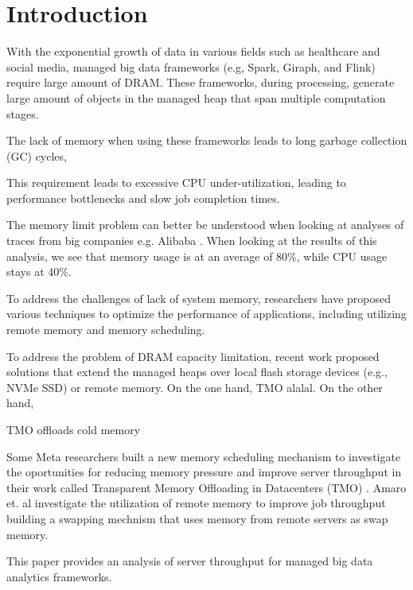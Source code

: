 \section{Introduction}
\label{sec:intro}

With the exponential growth of data in various fields such as
healthcare and social media, managed big data frameworks (e.g, Spark,
Giraph, and Flink) require large amount of DRAM. 
These frameworks, during processing, generate large amount of objects
in the managed heap that span multiple computation stages.


The lack of memory when using these frameworks leads to long
garbage collection (GC) cycles, 

This
requirement leads to excessive CPU under-utilization, leading to
performance bottlenecks and slow job completion times.

The memory limit problem can better be understood when looking at
analyses of traces from big companies e.g. Alibaba \cite{Alibaba}.
When looking at the results of this analysis, we see that memory usage
is at an average of 80\%, while CPU usage stays at 40\%. 

To address the challenges of lack of system memory, researchers have
proposed various techniques to optimize the performance of
applications, including utilizing remote memory and memory scheduling.

To address the problem of DRAM capacity limitation, recent work
proposed solutions that extend the managed heaps over local flash
storage devices (e.g., NVMe SSD) or remote memory. On the one hand,
TMO alalal. On the other hand,  

TMO offloads cold memory 


Some Meta researchers built a new memory scheduling mechanism to
investigate the oportunities for reducing memory pressure and improve
server throughput in their work called Transparent Memory Offloading
in Datacenters (TMO) \cite{TMO}. Amaro et. al investigate the
utilization of remote memory to improve job throughput \cite{CFM}
building a swapping mechnism that uses memory from remote servers as
swap memory.

This paper provides an  analysis of server throughput for managed big
data analytics frameworks. 

